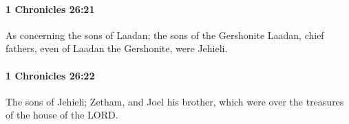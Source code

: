 		\paragraph{1 Chronicles 26:21} %
			\label{1CHRONICLES-26-21}

			As concerning the sons of Laadan; the sons of the Gershonite Laadan, chief fathers, even of Laadan the Gershonite, were Jehieli.


		\paragraph{1 Chronicles 26:22} %
			\label{1CHRONICLES-26-22}

			The sons of Jehieli; Zetham, and Joel his brother, which were over the treasures of the house of the LORD.


